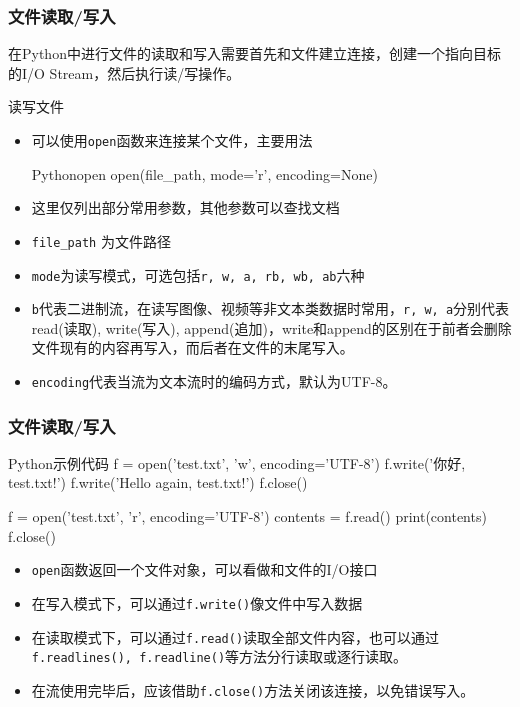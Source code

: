 \documentclass[9pt]{beamer}
\begin{document}
\begin{frame}[fragile]
    \frametitle{文件读取/写入}

    在Python中进行文件的读取和写入需要首先和文件建立连接，创建一个指向目标的I/O Stream，然后执行读/写操作。

    \begin{block}{读写文件}
        \begin{itemize}
            \item 可以使用\texttt{open}函数来连接某个文件，主要用法
            
            \begin{codebox}{Python}{open}
open(file_path, mode='r', encoding=None)\end{codebox}

            \item 这里仅列出部分常用参数，其他参数可以查找文档
            \item \texttt{file_path} 为文件路径
            \item \texttt{mode}为读写模式，可选包括\texttt{r, w, a, rb, wb, ab}六种
            \item \texttt{b}代表二进制流，在读写图像、视频等非文本类数据时常用，\texttt{r, w, a}分别代表read(读取), write(写入), append(追加)，write和append的区别在于前者会删除文件现有的内容再写入，而后者在文件的末尾写入。
            \item \texttt{encoding}代表当流为文本流时的编码方式，默认为UTF-8。
        \end{itemize}
    \end{block}
\end{frame}

\begin{frame}[fragile]
    \frametitle{文件读取/写入}
\begin{codebox}{Python}{示例代码}
f = open('test.txt', 'w', encoding='UTF-8')
f.write('你好, test.txt!\n')
f.write('Hello again, test.txt!\n')
f.close()

f = open('test.txt', 'r', encoding='UTF-8')
contents = f.read()
print(contents)
f.close()
\end{codebox}

\begin{itemize}
    \item \texttt{open}函数返回一个文件对象，可以看做和文件的I/O接口
    \item 在写入模式下，可以通过\texttt{f.write()}像文件中写入数据
    \item 在读取模式下，可以通过\texttt{f.read()}读取全部文件内容，也可以通过\texttt{f.readlines(), f.readline()}等方法分行读取或逐行读取。
    \item 在流使用完毕后，应该借助\texttt{f.close()}方法关闭该连接，以免错误写入。
\end{itemize}

\end{frame}
\end{document}
